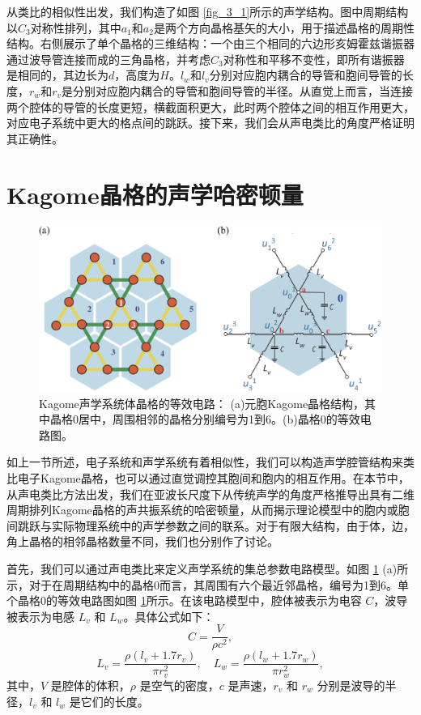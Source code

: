 从类比的相似性出发，我们构造了如图 \ref{fig_3_1}所示的声学结构。图中周期结构以$C_{3}$对称性排列，其中$a_1$和$a_2$是两个方向晶格基矢的大小，用于描述晶格的周期性结构。右侧展示了单个晶格的三维结构：一个由三个相同的六边形亥姆霍兹谐振器通过波导管连接而成的三角晶格，并考虑$C_3$对称性和平移不变性，即所有谐振器是相同的，其边长为$d$，高度为$H$。$l_w$和$l_v$分别对应胞内耦合的导管和胞间导管的长度，$r_w$和$r_v$是分别对应胞内耦合的导管和胞间导管的半径。从直觉上而言，当连接两个腔体的导管的长度更短，横截面积更大，此时两个腔体之间的相互作用更大，对应电子系统中更大的格点间的跳跃\cite{j4,h8}。接下来，我们会从声电类比的角度严格证明其正确性。

\section{Kagome晶格的声学哈密顿量}

\begin{figure}[h!]
  \centering
  \includegraphics[width=1\textwidth]{images/fig3-2.eps} 
  \caption{Kagome声学系统体晶格的等效电路：
  (a)元胞Kagome晶格结构，其中晶格0居中，周围相邻的晶格分别编号为1到6。(b)晶格0的等效电路图。
  }
  \label{fig_3_2}
\end{figure}

如上一节所述，电子系统和声学系统有着相似性，我们可以构造声学腔管结构来类比电子Kagome晶格，也可以通过直觉调控其胞间和胞内的相互作用。在本节中，从声电类比方法出发，我们在亚波长尺度下从传统声学的角度严格推导出具有二维周期排列Kagome晶格的声共振系统的哈密顿量，从而揭示理论模型中的胞内或胞间跳跃与实际物理系统中的声学参数之间的联系。对于有限大结构，由于体，边，角上晶格的相邻晶格数量不同，我们也分别作了讨论。

首先，我们可以通过声电类比来定义声学系统的集总参数电路模型。如图 \ref{fig_3_2} (a)所示，对于在周期结构中的晶格0而言，其周围有六个最近邻晶格，编号为1到6。单个晶格0的等效电路图如图 \ref{fig_3_2}所示。在该电路模型中，腔体被表示为电容 \( C \)，波导被表示为电感 \( L_v \) 和 \( L_w \)。具体公式如下：
\begin{equation} \label{eq3-1}
  C = \frac{V}{\rho c^2},
\end{equation}
\begin{equation} \label{eq3-2}
  L_v = \frac{\rho (l_v + 1.7r_v)}{\pi r_v^2}, \quad L_w = \frac{\rho (l_w + 1.7r_w)}{\pi r_w^2},
\end{equation}
其中，\( V \) 是腔体的体积，\( \rho \) 是空气的密度，\( c \) 是声速，\( r_v \) 和 \( r_w \) 分别是波导的半径，\( l_v \) 和 \( l_w \) 是它们的长度。

